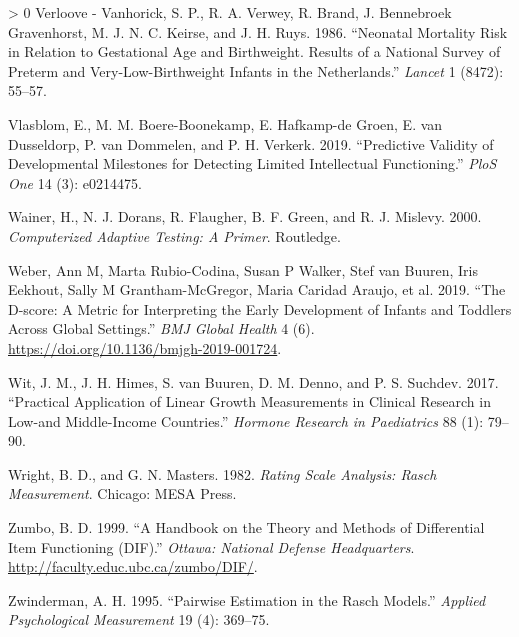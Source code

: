\documentclass[
]{book}
\newlength{\cslhangindent}
\newenvironment{CSLReferences}[3] %
 {%
  \setlength{\parindent}{0pt}
  \ifodd #1 \everypar{\setlength{\hangindent}{\cslhangindent}}\ignorespaces\fi
  \ifnum #2 > 0
  \setlength{\parskip}{#2\baselineskip}
  \fi
 }%
 {}
\begin{document}
\begin{CSLReferences}{1}{0}
\leavevmode\hypertarget{ref-verloove1986}{}%
Verloove - Vanhorick, S. P., R. A. Verwey, R. Brand, J. Bennebroek Gravenhorst, M. J. N. C. Keirse, and J. H. Ruys. 1986. {``Neonatal Mortality Risk in Relation to Gestational Age and Birthweight. Results of a National Survey of Preterm and Very-Low-Birthweight Infants in the Netherlands.''} \emph{Lancet} 1 (8472): 55--57.

\leavevmode\hypertarget{ref-vlasblom2019}{}%
Vlasblom, E., M. M. Boere-Boonekamp, E. Hafkamp-de Groen, E. van Dusseldorp, P. van Dommelen, and P. H. Verkerk. 2019. {``Predictive Validity of Developmental Milestones for Detecting Limited Intellectual Functioning.''} \emph{PloS One} 14 (3): e0214475.

\leavevmode\hypertarget{ref-wainer2000}{}%
Wainer, H., N. J. Dorans, R. Flaugher, B. F. Green, and R. J. Mislevy. 2000. \emph{Computerized Adaptive Testing: A Primer}. Routledge.

\leavevmode\hypertarget{ref-Weber2019}{}%
Weber, Ann M, Marta Rubio-Codina, Susan P Walker, Stef van Buuren, Iris Eekhout, Sally M Grantham-McGregor, Maria Caridad Araujo, et al. 2019. {``The {D-score}: A Metric for Interpreting the Early Development of Infants and Toddlers Across Global Settings.''} \emph{BMJ Global Health} 4 (6). \url{https://doi.org/10.1136/bmjgh-2019-001724}.

\leavevmode\hypertarget{ref-wit2017practical}{}%
Wit, J. M., J. H. Himes, S. van Buuren, D. M. Denno, and P. S. Suchdev. 2017. {``Practical Application of Linear Growth Measurements in Clinical Research in Low-and Middle-Income Countries.''} \emph{Hormone Research in Paediatrics} 88 (1): 79--90.

\leavevmode\hypertarget{ref-wright1982}{}%
Wright, B. D., and G. N. Masters. 1982. \emph{Rating Scale Analysis: Rasch Measurement}. Chicago: MESA Press.

\leavevmode\hypertarget{ref-zumbo1999}{}%
Zumbo, B. D. 1999. {``A Handbook on the Theory and Methods of Differential Item Functioning ({DIF}).''} \emph{Ottawa: National Defense Headquarters}. \url{http://faculty.educ.ubc.ca/zumbo/DIF/}.

\leavevmode\hypertarget{ref-zwinderman1995}{}%
Zwinderman, A. H. 1995. {``Pairwise Estimation in the Rasch Models.''} \emph{Applied Psychological Measurement} 19 (4): 369--75.

\end{CSLReferences}
\end{document}
